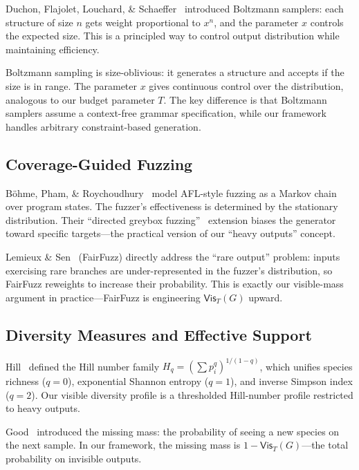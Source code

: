 \documentclass[11pt]{article}
\theoremstyle{remark}
\theoremstyle{definition}
\begin{document}
Duchon, Flajolet, Louchard, \& Schaeffer~\cite{duchon2004boltzmann} introduced
Boltzmann samplers: each structure of size $n$ gets weight proportional to $x^n$,
and the parameter $x$ controls the expected size.  This is a principled way to
control output distribution while maintaining efficiency.

Boltzmann sampling is size-oblivious: it generates a structure and accepts if
the size is in range.  The parameter $x$ gives continuous control over the
distribution, analogous to our budget parameter $T$.  The key difference is
that Boltzmann samplers assume a context-free grammar specification, while our
framework handles arbitrary constraint-based generation.

\subsection{Coverage-Guided Fuzzing}

B\"ohme, Pham, \& Roychoudhury~\cite{bohme2016coverage} model AFL-style fuzzing
as a Markov chain over program states.  The fuzzer's effectiveness is determined
by the stationary distribution.  Their ``directed greybox
fuzzing''~\cite{bohme2017directed} extension biases the generator toward
specific targets---the practical version of our ``heavy outputs'' concept.

Lemieux \& Sen~\cite{lemieux2018fairfuzz} (FairFuzz) directly address the
``rare output'' problem: inputs exercising rare branches are
under-represented in the fuzzer's distribution, so FairFuzz reweights to
increase their probability.  This is exactly our visible-mass argument in
practice---FairFuzz is engineering $\mathsf{Vis}_T(G)$ upward.

\subsection{Diversity Measures and Effective Support}

Hill~\cite{hill1973diversity} defined the Hill number family
$H_q = (\sum p_i^q)^{1/(1-q)}$, which unifies species richness ($q=0$),
exponential Shannon entropy ($q=1$), and inverse Simpson index ($q=2$).
Our visible diversity profile is a thresholded Hill-number profile restricted
to heavy outputs.

Good~\cite{good1953population} introduced the missing mass: the probability of
seeing a new species on the next sample.  In our framework, the missing mass is
$1 - \mathsf{Vis}_T(G)$---the total probability on invisible outputs.
\end{document}

